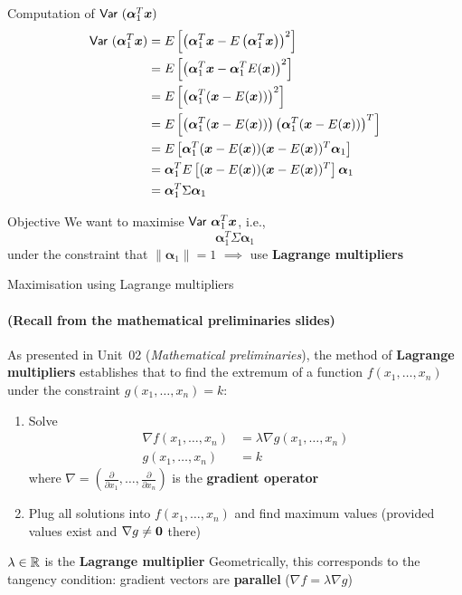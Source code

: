 \documentclass[aspectratio=169]{beamer}\usepackage[]{graphicx}\usepackage[]{xcolor}
\begin{document}
\begin{frame}{Computation of $\mathsf{Var}\ (\bm{\alpha}_1^T\bm{x})$}
\begin{align*}
\mathsf{Var}\ (\bm{\alpha}_1^T\bm{x}) 
&= E\left[\left(\bm{\alpha}_1^T\bm{x} - E\left(\bm{\alpha}_1^T\bm{x}\right)\right)^2\right] \\
&= E\left[\left(\bm{\alpha}_1^T\bm{x} - \bm{\alpha}_1^T E(\bm{x})\right)^2\right] \\
&= E\left[\left(\bm{\alpha}_1^T(\bm{x} - E(\bm{x}))\right)^2\right] \\
&= E\left[\left(\bm{\alpha}_1^T(\bm{x} - E(\bm{x}))\right)\left(\bm{\alpha}_1^T(\bm{x} - E(\bm{x}))\right)^T\right] \\
&= E\left[\bm{\alpha}_1^T(\bm{x} - E(\bm{x}))(\bm{x} - E(\bm{x}))^T\bm{\alpha}_1\right] \\
&= \bm{\alpha}_1^T E\left[(\bm{x} - E(\bm{x}))(\bm{x} - E(\bm{x}))^T\right]\bm{\alpha}_1 \\
&= \bm{\alpha}_1^T\Sigma\bm{\alpha}_1
\end{align*}
\end{frame}


\begin{frame}{Objective}
We want to maximise $\mathsf{Var}\  \bm{\alpha}_1^T\bm{x}$, i.e.,
\[
\bm{\alpha}_1^T\Sigma\bm{\alpha}_1
\]
under the constraint that $\|\bm{\alpha}_1\|=1$
\vfill
$\implies$ use \textbf{Lagrange multipliers}
\end{frame}


\begin{frame}{Maximisation using Lagrange multipliers}
\framesubtitle{(Recall from the mathematical preliminaries slides)}
As presented in Unit~02 (\emph{Mathematical preliminaries}), the method of \textbf{Lagrange multipliers} establishes that to find the extremum of a function $f(x_1,\ldots,x_n)$ under the constraint $g(x_1,\ldots,x_n)=k$:
\begin{enumerate}
\item Solve
\begin{align*}
\nabla f(x_1,\ldots,x_n) &= \lambda\nabla g(x_1,\ldots,x_n) \\
g(x_1,\ldots,x_n) &= k
\end{align*}
where $\nabla=\left(\frac{\partial}{\partial x_1},\ldots,\frac{\partial}{\partial x_n}\right)$ is the \textbf{gradient operator}
\item Plug all solutions into $f(x_1,\ldots,x_n)$ and find maximum values (provided values exist and $\nabla g\neq \b0$ there)
\end{enumerate}
\vfill
$\lambda\in\mathbb{R}$ is the \textbf{Lagrange multiplier}
\vfill
Geometrically, this corresponds to the tangency condition: gradient vectors are \textbf{parallel} ($\nabla f = \lambda \nabla g$)
\end{frame}
\end{document}
